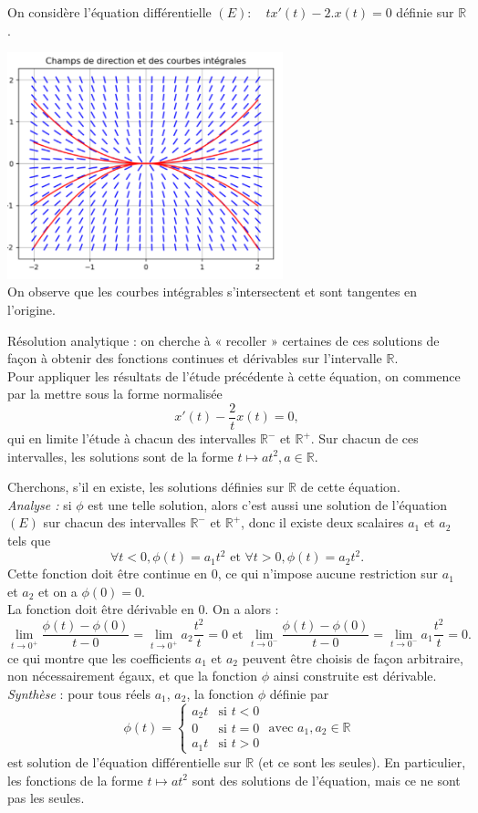 \documentclass{book}
\begin{document}
\begin{Exemple}   On considère l'équation différentielle $(E):\quad tx'(t)  -2.x(t)=0$ définie sur $\mathbb{R}$. 
\begin{center}
\includegraphics[width=8cm]{C7_equation_differentielle_raccord.png}\\
On observe que les courbes intégrables s'intersectent et sont tangentes en l'origine.
\end{center}
Résolution analytique : on cherche à « recoller » certaines de ces solutions de façon à obtenir des fonctions continues et dérivables sur
l'intervalle $\mathbb{R}$.\\
Pour appliquer les résultats de l'étude précédente à cette équation, on commence par la mettre sous la forme normalisée
$$ x'(t)  -\frac{2}{t}x(t)=0,$$
qui en limite l'étude à chacun des intervalles $\mathbb{R}^-$ et $\mathbb{R}^+$. Sur chacun de ces intervalles, les solutions sont
de la forme $t \mapsto at^2, a \in  \mathbb{R}$.

Cherchons, s'il en existe, les solutions définies sur $\mathbb{R}$ de cette équation.\\
\textit{Analyse :} si $\phi  $ est une telle solution, alors c'est aussi une solution de l'équation $(E)$ sur chacun des
intervalles $\mathbb{R}^-$ et $\mathbb{R}^+$, donc il existe deux scalaires $a_1$ et $a_2$ tels que
$$\forall t < 0, \phi  (t) = a_1 t^2\text{ et } \forall t > 0, \phi  (t) = a_2 t^2.$$
Cette fonction doit être continue en 0, ce qui n'impose aucune restriction sur $a_1$ et $a_2$ et on a $\phi  (0) = 0$.\\
La fonction doit être dérivable en 0. On a alors :
$$\lim_{t\to 0^+} \frac{\phi  (t) - \phi  (0)}{t - 0}= \lim_{t\to 0^+}a_2 \frac{t^2}{t}=0 \text{ et } \lim_{t\to 0^-} \frac{\phi  (t) - \phi  (0)}{t - 0}= \lim_{t\to 0^-}a_1 \frac{t^2}{t}=0.$$
ce qui montre que les coefficients $a_1$ et $a_2$ peuvent être choisis de façon arbitraire, non nécessairement
égaux, et que la fonction $\phi  $ ainsi construite est dérivable.\\
\textit{Synthèse} : pour tous réels $a_1$, $a_2$, la fonction $\phi  $ définie par
$$\phi  (t) =\begin{cases}a_2 t &\text{si }t<0 \\0 &\text{si }t=0\\ a_1 t &\text{si }t>0\end{cases}\text{ avec } a_1, a_2 \in  \mathbb{R} $$
est solution de l'équation différentielle sur $\mathbb{R}$ (et ce sont les seules). En particulier, les fonctions de la forme $t \mapsto a t^2$
sont des solutions de l'équation, mais ce ne sont pas les seules.


\end{Exemple}
\end{document}
